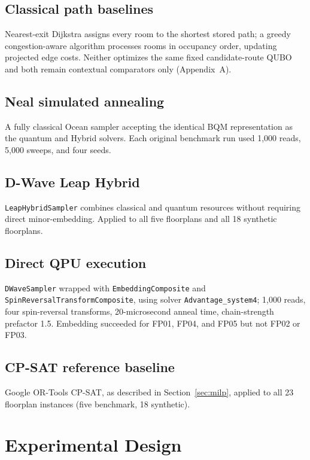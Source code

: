 \documentclass[11pt]{article}
\begin{document}
\subsection{Classical path baselines}
Nearest-exit Dijkstra assigns every room to the shortest stored path; a greedy congestion-aware algorithm processes rooms in occupancy order, updating projected edge costs. Neither optimizes the same fixed candidate-route QUBO and both remain contextual comparators only (Appendix~A).

\subsection{Neal simulated annealing}
A fully classical Ocean sampler accepting the identical BQM representation as the quantum and Hybrid solvers. Each original benchmark run used 1,000 reads, 5,000 sweeps, and four seeds.

\subsection{D-Wave Leap Hybrid}
\texttt{LeapHybridSampler} combines classical and quantum resources without requiring direct minor-embedding. Applied to all five floorplans and all 18 synthetic floorplans.

\subsection{Direct QPU execution}
\texttt{DWaveSampler} wrapped with \texttt{EmbeddingComposite} and \texttt{SpinReversalTransformComposite}, using solver \texttt{Advantage\_system4}; 1,000 reads, four spin-reversal transforms, 20-microsecond anneal time, chain-strength prefactor 1.5. Embedding succeeded for FP01, FP04, and FP05 but not FP02 or FP03.

\subsection{CP-SAT reference baseline}
Google OR-Tools CP-SAT, as described in Section~\ref{sec:milp}, applied to all 23 floorplan instances (five benchmark, 18 synthetic).

\section{Experimental Design}
\end{document}
